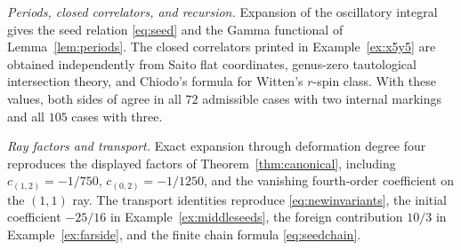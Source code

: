 \documentclass[11pt]{amsart}
\theoremstyle{definition}
\theoremstyle{remark}
\begin{document}
\emph{Periods, closed correlators, and recursion.}
Expansion of the oscillatory integral gives the seed relation
\eqref{eq:seed} and the Gamma functional of Lemma~\ref{lem:periods}.
The closed correlators printed in Example~\ref{ex:x5y5} are obtained
independently from Saito flat coordinates, genus-zero tautological
intersection theory, and Chiodo's formula for Witten's $r$-spin class.  With
these values, both sides of \cite[Thm.~0.5]{GKT} agree in all $72$ admissible
cases with two internal markings and all $105$ cases with three.

\emph{Ray factors and transport.}
Exact expansion through deformation degree four reproduces the displayed
factors of Theorem~\ref{thm:canonical}, including
$c_{(1,2)}=-1/750$, $c_{(0,2)}=-1/1250$, and the vanishing fourth-order
coefficient on the $(1,1)$ ray.  The transport identities reproduce
\eqref{eq:newinvariants}, the initial coefficient $-25/16$ in
Example~\ref{ex:middleseeds}, the foreign contribution $10/3$ in
Example~\ref{ex:farside}, and the finite chain formula
\eqref{eq:seedchain}.
\end{document}
